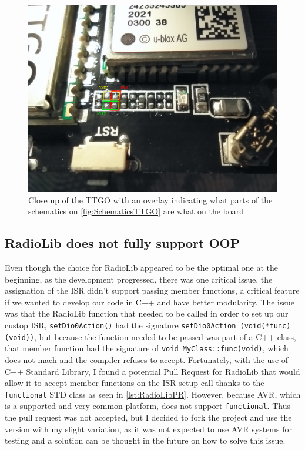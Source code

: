 \begin{figure}[h!]
        \centering
        \includegraphics[width=15cm]{Figures/DebuggerSolution.jpeg}
        \caption{Close up of the TTGO with an overlay indicating what parts of the schematics on \autoref{fig:SchematicsTTGO} are what on the board}
        \label{fig:DebuggerSolutiion}
\end{figure}

\subsection{RadioLib does not fully support OOP}
Even though the choice for RadioLib appeared to be the optimal one at the beginning, as the development progressed, there was one critical issue, the assignation of the ISR didn't support passing member functions, a critical feature if we wanted to develop our code in C++ and have better modularity. The issue was that the RadioLib function that needed to be called in order to set up our custop ISR, \texttt{setDio0Action()} had the signature \texttt{setDio0Action (void(*func)(void))}, but because the function needed to be passed was part of a C++ class, that member function had the signature of \texttt{void MyClass::func(void)}, which does not mach and the compiler refuses to accept. Fortunately, with the use of C++ Standard Library, I found a potential Pull Request for RadioLib that would allow it to accept member functions on the ISR setup call thanks to the \texttt{functional} STD class as seen in \autoref{lst:RadioLibPR}. However, because AVR, which is a supported and very common platform, does not support \texttt{functional}\cite{RadioLibPR}. Thus the pull request was not accepted, but I decided to fork the project and use the version with my slight variation, as it was not expected to use AVR systems for testing and a solution can be thought in the future on how to solve this issue.

